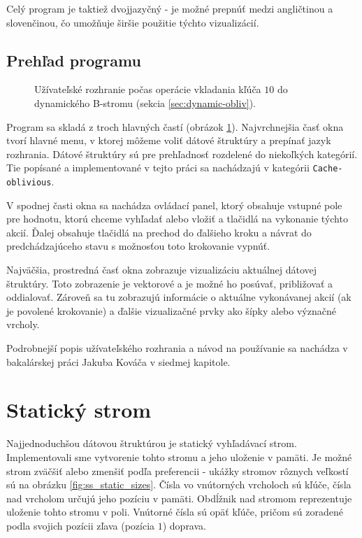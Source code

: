 Celý program je taktiež dvojjazyčný - je možné prepnúť medzi angličtinou a slovenčinou, čo umožňuje širšie použitie týchto vizualizácií.

\subsection{Prehľad programu}
\begin{figure}
    \centering
    \resizebox{0.9\textwidth}{!}{%
            
    }
    \caption{Užívateľské rozhranie počas operácie vkladania kľúča $10$ do dynamického \obliv B-stromu (sekcia \ref{sec:dynamic-obliv}).}
    \label{fig:ss_overview}
\end{figure}

Program sa skladá z troch hlavných častí (obrázok \ref{fig:ss_overview}). Najvrchnejšia časť okna tvorí hlavné menu, v ktorej môžeme voliť dátové štruktúry a prepínať jazyk rozhrania. Dátové štruktúry sú pre prehľadnosť rozdelené do niekoľkých kategórií. Tie popísané a implementované v tejto práci sa nachádzajú v kategórii \texttt{Cache-oblivious}.

V spodnej časti okna sa nachádza ovládací panel, ktorý obsahuje vstupné pole pre hodnotu, ktorú chceme vyhľadať alebo vložiť a tlačidlá na vykonanie týchto akcií. Ďalej obsahuje tlačidlá na prechod do ďalšieho kroku a návrat do predchádzajúceho stavu s možnosťou toto krokovanie vypnúť.

Najväčšia, prostredná časť okna zobrazuje vizualizáciu aktuálnej dátovej štruktúry. Toto zobrazenie je vektorové a je možné ho posúvať, približovať a oddialovať. Zároveň sa tu zobrazujú informácie o aktuálne vykonávanej akcií (ak je povolené krokovanie) a ďalšie vizualizačné prvky ako šípky alebo význačné vrcholy.

Podrobnejší popis užívateľského rozhrania a návod na používanie sa nachádza v bakalárskej práci Jakuba Kováča \citep{algviskuko} v siedmej kapitole.

\section{Statický strom}
Najjednoduchšou dátovou štruktúrou je statický vyhľadávací strom. Implementovali sme vytvorenie tohto stromu a jeho uloženie v pamäti. Je možné strom zväčšiť alebo zmenšiť podľa preferencii - ukážky stromov rôznych veľkostí sú na obrázku \ref{fig:ss_static_sizes}. Čísla vo vnútorných vrcholoch sú kľúče, čísla nad vrcholom určujú jeho pozíciu v pamäti. Obdĺžnik nad stromom reprezentuje uloženie tohto stromu v poli. Vnútorné čísla sú opäť kľúče, pričom sú zoradené podla svojich pozícii zľava (pozícia $1$) doprava.

